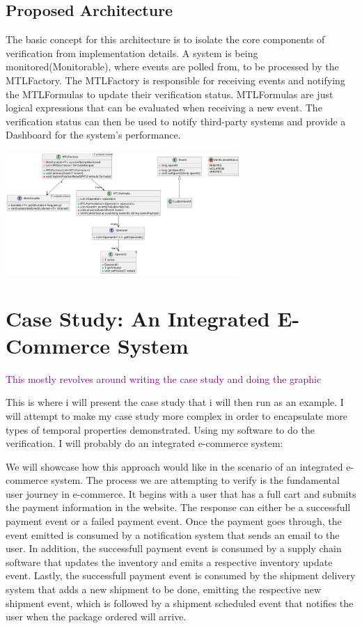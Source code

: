 \documentclass[twocolumn]{article}
\newcommand{\note}[1] {
	\textcolor{Purple}{#1}

}
\begin{document}
\subsection{Proposed Architecture}
The basic concept for this architecture is to isolate the core components of verification from implementation details.
A system is being monitored(Monitorable), where events are polled from, to be processed by the MTLFactory. The MTLFactory is responsible for receiving events and notifying the MTLFormulas to update their verification status. MTLFormulas are just logical expressions that can be evaluated when receiving a new event. The verification status can then be used to notify third-party systems and provide a Dashboard for the system's performance.

\includegraphics[width=3.5in]{uml-diagram.pdf}


\section{Case Study: An Integrated E-Commerce System}
\note{This mostly revolves around writing the case study and doing the graphic}
This is where i will present the case study that i will then run as an example.
I will attempt to make my case study more complex in order to encapsulate more types of temporal properties demonstrated.
Using my software to do the verification. I will probably do an integrated e-commerce system:

We will showcase how this approach would like in the scenario of an integrated e-commerce system.
The process we are attempting to verify is the fundamental user journey in e-commerce.
It begins with a user that has a full cart and submits the payment information in the website.
The response can either be a successfull payment event or a failed payment event.
Once the payment goes through, the event emitted is consumed by a notification system that sends an email to the user.
In addition, the successfull payment event is consumed by a supply chain software that updates the inventory and emits
a respective inventory update event.
Lastly, the successfull payment event is consumed by the shipment delivery system that adds a new shipment to be done,
emitting the respective new shipment event, which is followed by a shipment scheduled event that notifies the user when
the package ordered will arrive.
\end{document}
